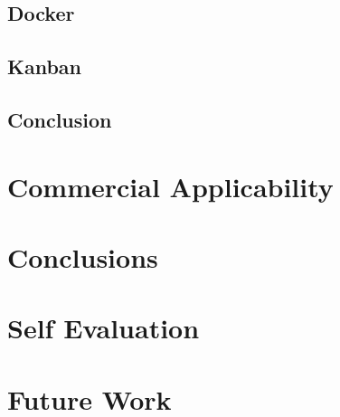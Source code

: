 \subsection{Docker}
\subsection{Kanban}

\subsection{Conclusion}

\section{Commercial Applicability}

\section{Conclusions}

\section{Self Evaluation}

\section{Future Work}